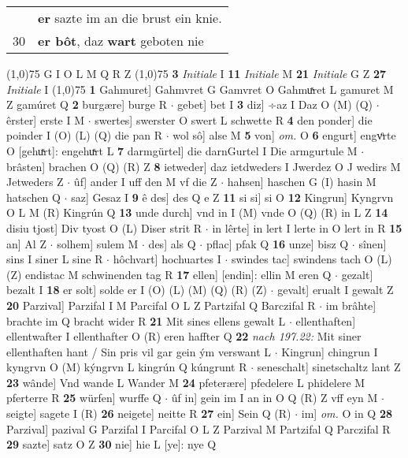 \documentclass[8pt,a4paper,notitlepage]{article}
\begin{document}
\begin{table}[ht]
\begin{minipage}[t]{0.5\linewidth}
\begin{tabular}{rl}
 & \textbf{er} sazte im an die brust ein knie.\\ 
30 & \textbf{er bôt}, daz \textbf{wart} geboten nie\\ 
\end{tabular}
\scriptsize
\line(1,0){75} \newline
G I O L M Q R Z \newline
\line(1,0){75} \newline
\textbf{3} \textit{Initiale} I  \textbf{11} \textit{Initiale} M  \textbf{21} \textit{Initiale} G Z  \textbf{27} \textit{Initiale} I  \newline
\line(1,0){75} \newline
\textbf{1} Gahmuret] Gahmvret G Gamvret O Gahmuͯret L gamuret M Z gamúret Q \textbf{2} burgære] burge R  $\cdot$ gebet] bet I \textbf{3} diz] ÷az I Daz O (M) (Q)  $\cdot$ êrster] erste I M  $\cdot$ swertes] swerster O swert L schwette R \textbf{4} den ponder] die poinder I (O) (L) (Q) die pan R  $\cdot$ wol sô] alse M \textbf{5} von] \textit{om.} O \textbf{6} engurt] engvͦrte O [gehuͯrt]: engehuͯrt L \textbf{7} darmgürtel] die darnGurtel I Die armgurtule M  $\cdot$ brâsten] brachen O (Q) (R) Z \textbf{8} ietweder] daz ietdweders I Jwerdez O J wedirs M Jetweders Z  $\cdot$ ûf] ander I uff den M vf die Z  $\cdot$ hahsen] haschen G (I) hasin M hatschen Q  $\cdot$ saz] Gesaz I \textbf{9} ê des] des Q e Z \textbf{11} si si] si O \textbf{12} Kingrun] Kyngrvn O L M (R) Kingrún Q \textbf{13} unde durch] vnd in I (M) vnde O (Q) (R) in L Z \textbf{14} disiu tjost] Div tyost O (L) Diser strit R  $\cdot$ in lêrte] in lert I lerte in O lert in R \textbf{15} an] Al Z  $\cdot$ solhem] sulem M  $\cdot$ des] als Q  $\cdot$ pflac] pfak Q \textbf{16} unze] bisz Q  $\cdot$ sînen] sins I siner L sine R  $\cdot$ hôchvart] hochuartes I  $\cdot$ swindes tac] swindens tach O (L) (Z) endistac M schwinenden tag R \textbf{17} ellen] [endin]: ellin M eren Q  $\cdot$ gezalt] bezalt I \textbf{18} er solt] solde er I (O) (L) (M) (Q) (R) (Z)  $\cdot$ gevalt] erualt I gewalt Z \textbf{20} Parzival] Parzifal I M Parcifal O L Z Partzifal Q Barczifal R  $\cdot$ im brâhte] brachte im Q bracht wider R \textbf{21} Mit sines ellens gewalt L  $\cdot$ ellenthaften] ellentwafter I ellenthafter O (R) eren haffter Q \textbf{22} \textit{nach 197.22:} Mit siner ellenthaften hant / Sin pris vil gar gein ým verswant L   $\cdot$ Kingrun] chingrun I kyngrvn O (M) kýngrvn L kingrún Q kúngrunt R  $\cdot$ seneschalt] sinetschaltz lant Z \textbf{23} wânde] Vnd wande L Wander M \textbf{24} pfeterære] pfedelere L phidelere M pferterre R \textbf{25} würfen] wurffe Q  $\cdot$ ûf in] gein im I an in O Q (R) Z vff eyn M  $\cdot$ seigte] sagete I (R) \textbf{26} neigete] neitte R \textbf{27} ein] Sein Q (R)  $\cdot$ im] \textit{om.} O in Q \textbf{28} Parzival] pazival G Parzifal I Parcifal O L Z Parzival M Partzifal Q Parczifal R \textbf{29} sazte] satz O Z \textbf{30} nie] hie L [ye]: nye Q \newline

\end{minipage}
\end{table}
\end{document}
